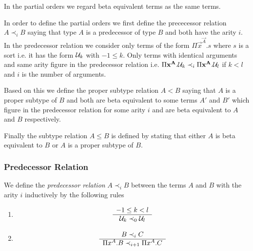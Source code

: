 In the partial orders we regard beta equivalent terms as the same terms.

In order to define the partial orders we first define the prececessor relation
$A \prec_i B$ saying that type $A$ is a predecessor of type $B$ and both have
the arity $i$. In the predecessor relation we consider only terms of the form
$\Pi \vec{x}^\vec{A}. s$ where $s$ is a sort i.e. it has the form ${\cal U}_k$ with
$-1 \le k$. Only terms with identical arguments and same arity figure in the
predecessor relation i.e. $\Pi {\mathbf x}^{\mathbf A}. {\cal U}_k \prec_i \Pi
{\mathbf x}^{\mathbf A}. {\cal U}_l$ if $k < l$ and $i$ is the number of arguments.

Based on this we define the proper subtype relation $A < B$ saying that $A$ is a
proper subtype of $B$ and both are beta equivalent to some terms $A'$ and $B'$
which figure in the predecessor relation for some arity $i$ and are beta
equivalent to $A$ and $B$ respectively.

Finally the subtype relation $A \le B$ is defined by stating that either $A$ is
beta equivalent to $B$ or $A$ is a proper subtype of $B$.



\subsubsection{Predecessor Relation}

\begin{definition}
    We define the
    \emph{predecessor relation}
    $A \prec_i B$ between the terms $A$
    and $B$ with the arity $i$ inductively by the following rules
    \begin{enumerate}
    \item
        $$
        \begin{array}{c} 
            -1 \le k < l
         \\ \hline 
            {\cal U}_k \prec_0 {\cal U}_l
        \end{array}
        $$

    \item
        $$
        \begin{array}{c} 
            B \prec_i C
         \\ \hline 
            \Pi x^A. B \prec_{i+1} \Pi x^A. C
        \end{array}
        $$
    \end{enumerate}
\end{definition}






